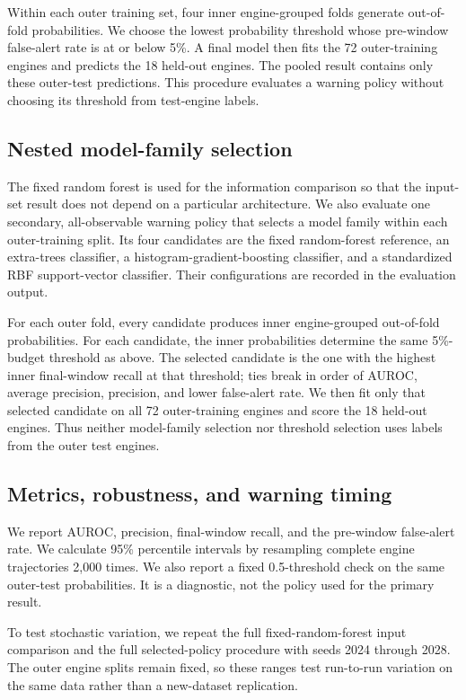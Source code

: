Within each outer training set, four inner engine-grouped folds generate
out-of-fold probabilities. We choose the lowest probability threshold whose
pre-window false-alert rate is at or below 5\%. A final model then fits the 72
outer-training engines and predicts the 18 held-out engines. The pooled result
contains only these outer-test predictions. This procedure evaluates a warning
policy without choosing its threshold from test-engine labels.

\subsection{Nested model-family selection}

The fixed random forest is used for the information comparison so that the
input-set result does not depend on a particular architecture. We also evaluate
one secondary, all-observable warning policy that selects a model family within
each outer-training split. Its four candidates are the fixed random-forest
reference, an extra-trees classifier, a histogram-gradient-boosting classifier,
and a standardized RBF support-vector classifier. Their configurations are
recorded in the evaluation output.

For each outer fold, every candidate produces inner engine-grouped out-of-fold
probabilities. For each candidate, the inner probabilities determine the same
5\%-budget threshold as above. The selected candidate is the one with the
highest inner final-window recall at that threshold; ties break in order of
AUROC, average precision, precision, and lower false-alert rate. We then fit
only that selected candidate on all 72 outer-training engines and score the 18
held-out engines. Thus neither model-family selection nor threshold selection
uses labels from the outer test engines.

\subsection{Metrics, robustness, and warning timing}

We report AUROC, precision, final-window recall, and the pre-window false-alert
rate. We calculate 95\% percentile intervals by resampling complete engine
trajectories 2,000 times. We also report a fixed 0.5-threshold check on the
same outer-test probabilities. It is a diagnostic, not the policy used for the
primary result.

To test stochastic variation, we repeat the full fixed-random-forest input
comparison and the full selected-policy procedure with seeds 2024 through 2028.
The outer engine splits remain fixed, so these ranges test run-to-run variation
on the same data rather than a new-dataset replication.

